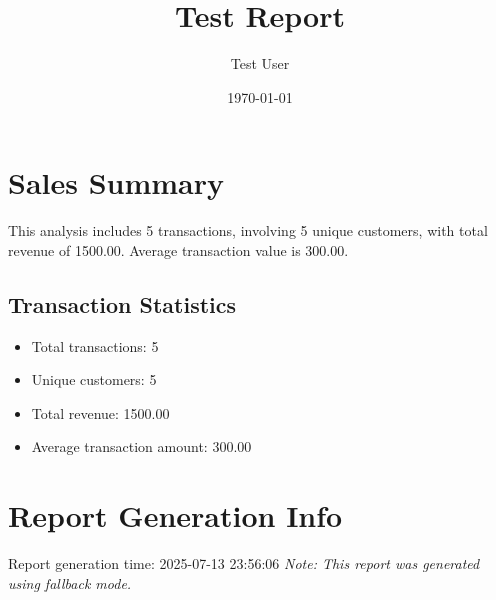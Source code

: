 \documentclass{article}
\title{Test Report}
\author{Test User}
\date{\today}
\begin{document}
\maketitle

\section{Sales Summary}
This analysis includes 5 transactions,
involving 5 unique customers,
with total revenue of 1500.00.
Average transaction value is 300.00.

\subsection{Transaction Statistics}
\begin{itemize}
\item Total transactions: 5
\item Unique customers: 5
\item Total revenue: 1500.00
\item Average transaction amount: 300.00
\end{itemize}

\section{Report Generation Info}
Report generation time: 2025-07-13 23:56:06
\textit{Note: This report was generated using fallback mode.}
\end{document}
